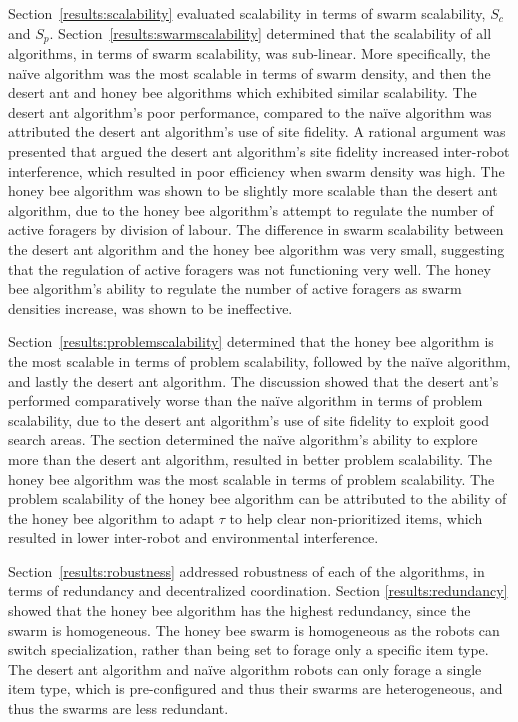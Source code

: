 Section~\ref{results:scalability} evaluated scalability in terms of swarm scalability, $S_c$ and $S_p$. Section~\ref{results:swarmscalability} determined that the scalability of all algorithms, in terms of swarm scalability, was sub-linear. More specifically, the na\"ive algorithm was the most scalable in terms of swarm density, and then the desert ant and honey bee algorithms which exhibited similar scalability. The desert ant algorithm's poor performance, compared to the na\"ive algorithm was attributed the desert ant algorithm's use of site fidelity. A rational argument was presented that argued the desert ant algorithm's site fidelity increased inter-robot interference, which resulted in poor efficiency when swarm density was high. The honey bee algorithm was shown to be slightly more scalable than the desert ant algorithm, due to the honey bee algorithm's attempt to regulate the number of active foragers by division of labour. The difference in swarm scalability between the desert ant algorithm and the honey bee algorithm was very small, suggesting that the regulation of active foragers was not functioning very well. The honey bee algorithm's ability to regulate the number of active foragers as swarm densities increase, was shown to be ineffective. 

Section~\ref{results:problemscalability} determined that the honey bee algorithm is the most scalable in terms of problem scalability, followed by the na\"ive algorithm, and lastly the desert ant algorithm. The discussion showed that the desert ant's performed comparatively worse than the na\"ive algorithm in terms of problem scalability, due to the desert ant algorithm's use of site fidelity to exploit good search areas. The section determined the na\"ive algorithm's ability to explore more than the desert ant algorithm, resulted in better problem scalability. The honey bee algorithm was the most scalable in terms of problem scalability. The problem scalability of the honey bee algorithm can be attributed to the ability of the honey bee algorithm to adapt $\tau$ to help clear non-prioritized items, which resulted in lower inter-robot and environmental interference.

Section~\ref{results:robustness} addressed robustness of each of the algorithms, in terms of redundancy and decentralized coordination. Section \ref{results:redundancy} showed that the honey bee algorithm has the highest redundancy, since the swarm is homogeneous. The honey bee swarm is homogeneous as the robots can switch specialization, rather than being set to forage only a specific item type. The desert ant algorithm and na\"ive algorithm robots can only forage a single item type, which is pre-configured and thus their swarms are heterogeneous, and thus the swarms are less redundant.


